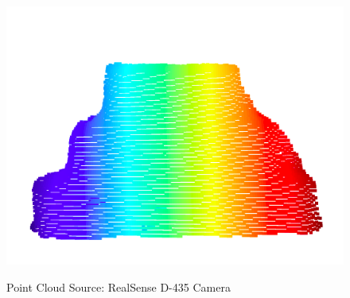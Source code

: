 \begin{figure}[htp]
\begin{center}
{
  \includegraphics[clip,width=0.6\columnwidth]{realnew/realnew_cloud.png}
}
\end{center}
\caption{Point Cloud Source: RealSense D-435 Camera}
\label{newrealsense}
\end{figure}



